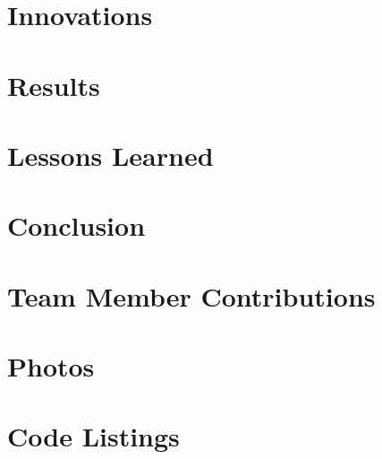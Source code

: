 \documentclass[12pt, letterpaper]{article}
\begin{document}
\section{Innovations}

\section{Results}

\section{Lessons Learned}

\section{Conclusion}


\section{Team Member Contributions}

\appendix
\section{Photos}

\section{Code Listings}
\end{document}
